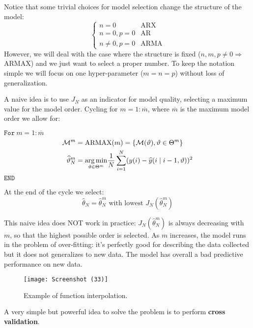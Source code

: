 Notice that some trivial choices for model selection change the structure of the model:
\begin{equation*}
\begin{cases}
n=0 & \text{ARX}\\
n=0,p=0 & \text{AR}\\
n\neq 0,p=0 & \text{ARMA}
\end{cases}
\end{equation*}
However, we will deal with the case where the structure is fixed ($ n,m,p\neq 0\Longrightarrow$ ARMAX) and we just want to select a proper number. To keep the notation simple we will focus on one hyper-parameter ($ m=n=p$) without loss of generalization.

A naive idea is to use $ J_{N}$ as an indicator for model quality, selecting a maximum value for the model order. Cycling for $ m=1:\overline{m}$, where $\overline{m}$ is the maximum model order we allow for:

$ \mathtt{For }\ m=1:\overline{m}$
\begin{equation*}
\begin{aligned}
\mathcal{M}^{m} & =\text{ARMAX}(m) =\left\{\mathcal{M}(\vartheta) ,\vartheta \in \Theta ^{m}\right\}\\
\widehat{\vartheta }_{N}^{m} & =\underset{\vartheta \in \Theta ^{m}}{\operatorname*{arg\,min}}\frac{1}{N}\sum _{i=1}^{N}(y(i) -\widehat{y}(i\mid i-1,\vartheta))^{2}
\end{aligned}
\end{equation*}
$ \mathtt{END}$

At the end of the cycle we select:
\begin{equation*}
\hat{\theta }_{N} =\hat{\theta }_{N}^{m} \text{ with lowest } J_{N}(\hat{\theta }_{N}^{m})
\end{equation*}
\begin{obs}
	This naive idea does NOT work in practice: $ J_{N}(\hat{\theta }_{N}^{m})$ is always decreasing with $ m$, so that the highest possible order is selected. As $m$ increases, the model runs in the problem of over-fitting: it's perfectly good for describing the data collected but it does not generalizes to new data. The model has overall a bad predictive performance on new data.
\end{obs}
\begin{figure}[htpb]
    \centering
    \texttt{[image: Screenshot (33)]}
    \caption{Example of function interpolation.}
\end{figure}
\FloatBarrier
A very simple but powerful idea to solve the problem is to perform \textbf{cross validation}.

